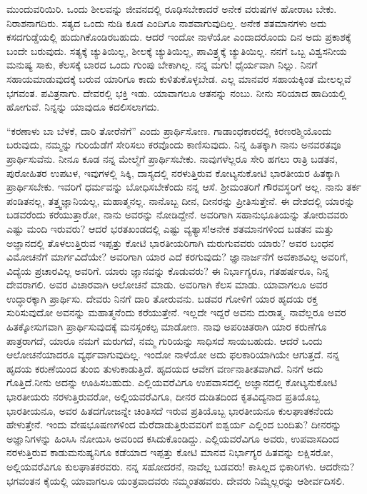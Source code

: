 ಮುಂದುವರಿಯಿರಿ. ಒಂದು ಶೀಲವನ್ನು ಜೀವನದಲ್ಲಿ ರೂಢಿಸಬೇಕಾದರೆ ಅನೇಕ ವರುಷಗಳ ಹೋರಾಟ ಬೇಕು. ನಿರಾಶನಾಗದಿರು. ಸತ್ಯದ ಒಂದು ನುಡಿ ಕೂಡ ಎಂದಿಗೂ ನಾಶವಾಗುವುದಿಲ್ಲ. ಅನೇಕ ಶತಮಾನಗಳು ಅದು ಕಸದಗುಡ್ಡೆಯಲ್ಲಿ ಹುದುಗಿಕೊಂಡಿರಬಹುದು. ಆದರೆ ಇಂದೋ ನಾಳೆಯೋ ಎಂದಾದರೊಂದು ದಿನ ಅದು ಪ್ರಕಾಶಕ್ಕೆ ಬಂದೇ ಬರುವುದು. ಸತ್ಯಕ್ಕೆ ಚ್ಯುತಿಯಿಲ್ಲ, ಶೀಲಕ್ಕೆ ಚ್ಯುತಿಯಿಲ್ಲ, ಪಾವಿತ್ರ್ಯಕ್ಕೆ ಚ್ಯುತಿಯಿಲ್ಲ. ನನಗೆ ಒಬ್ಬ ವಿಶ್ವಸನೀಯ ಮನುಷ್ಯ ಸಾಕು, ಕೆಲಸಕ್ಕೆ ಬಾರದ ಒಂದು ಗುಂಪು ಬೇಕಾಗಿಲ್ಲ. ನನ್ನ ಮಗು! ಧೈರ್ಯವಾಗಿ ನಿಲ್ಲು. ನಿನಗೆ ಸಹಾಯಮಾಡುವುದಕ್ಕೆ ಬರುವ ಯಾರಿಗೂ ಕಾದು ಕುಳಿತುಕೊಳ್ಳಬೇಡ. ಎಲ್ಲ ಮಾನವರ ಸಹಾಯಕ್ಕಿಂತ ಮೇಲಲ್ಲವೆ ಭಗವಂತ. ಪವಿತ್ರನಾಗು. ದೇವರಲ್ಲಿ ಭಕ್ತಿ ಇಡು. ಯಾವಾಗಲೂ ಆತನನ್ನು ನಂಬು. ನೀನು ಸರಿಯಾದ ಹಾದಿಯಲ್ಲಿ ಹೋಗುವೆ. ನಿನ್ನನ್ನು ಯಾವುದೂ ಕದಲಿಸಲಾಗದು.

“ಕರಣಾಳು ಬಾ ಬೆಳಕೆ, ದಾರಿ ತೋರೆನೆಗೆ” ಎಂದು ಪ್ರಾರ್ಥಿಸೋಣ. ಗಾಡಾಂಧಕಾರದಲ್ಲಿ ಕಿರಣರಶ್ಮಿಯೊಂದು ಬರುವುದು, ನಮ್ಮನ್ನು ಗುರಿಯೆಡೆಗೆ ಸೇರಿಸಲು ಕರವೊಂದು ಕಾಣಿಸುವುದು. ನಿನ್ನ ಹಿತಕ್ಕಾಗಿ ನಾನು ಅನವರತವೂ ಪ್ರಾರ್ಥಿಸುವೆನು. ನೀನೂ ಕೂಡ ನನ್ನ ಮೇಲ್ಮೆಗೆ ಪ್ರಾರ್ಥಿಸಬೇಕು. ನಾವುಗಳೆಲ್ಲರೂ ಸೇರಿ ಹಗಲು ರಾತ್ರಿ ಬಡತನ, ಪುರೋಹಿತರ ಉಪಟಳ, ಇವುಗಳಲ್ಲಿ ಸಿಕ್ಕಿ, ದಾಸ್ಯದಲ್ಲಿ ನರಳುತ್ತಿರುವ ಕೋಟ್ಯನುಕೋಟಿ ಭಾರತೀಯರ ಹಿತಕ್ಕಾಗಿ ಪ್ರಾರ್ಥಿಸಬೇಕು. ಇವರಿಗೆ ಧರ್ಮವನ್ನು ಬೋಧಿಸಬೇಕೆಂದು ನನ್ನ ಆಸೆ. ಶ‍್ರೀಮಂತರಿಗೆ ಗೌರವಸ್ಥರಿಗೆ ಅಲ್ಲ. ನಾನು ತರ್ಕ ಪಂಡಿತನಲ್ಲ, ತತ್ತ್ವಜ್ಞಾನಿಯಲ್ಲ, ಮಹಾತ್ಮನಲ್ಲ. ನಾನೊಬ್ಬ ದೀನ, ದೀನರನ್ನು ಪ್ರೀತಿಸುತ್ತೇನೆ. ಈ ದೇಶದಲ್ಲಿ ಯಾರನ್ನು ಬಡವರೆಂದು ಕರೆಯುತ್ತಾರೋ, ನಾನು ಅವರನ್ನು ನೋಡಿದ್ದೇನೆ. ಅವರಿಗಾಗಿ ಸಹಾನುಭೂತಿಯನ್ನು ತೋರುವವರು ಎಷ್ಟು ಮಂದಿ ಇರುವರು? ಆದರೆ ಭರತಖಂಡದಲ್ಲಿ ಎಷ್ಟು ವ್ಯತ್ಯಾಸ!ಅನೇಕ ಶತಮಾನಗಳಿಂದ ಬಡತನ ಮತ್ತು ಅಜ್ಞಾನದಲ್ಲಿ ತೊಳಲುತ್ತಿರುವ ಇಪ್ಪತ್ತು ಕೋಟಿ ಭಾರತೀಯರಿಗಾಗಿ ಮರುಗುವವರು ಯಾರು? ಅವರ ಬಂಧನ ವಿಮೋಚನೆಗೆ ಮಾರ್ಗವಿದೆಯೇ? ಅವರಿಗಾಗಿ ಯಾರ ಎದೆ ಕರಗುವುದು? ಜ್ಞಾನಾರ್ಜನೆಗೆ ಅವಕಾಶವಿಲ್ಲ ಅವರಿಗೆ, ವಿದ್ಯೆಯ ಪ್ರಚಾರವಿಲ್ಲ ಅವರಿಗೆ. ಯಾರು ಜ್ಞಾನವನ್ನು ಕೊಡುವರು? ಈ ನಿರ್ಭಾಗ್ಯರೂ, ಗತಹರ್ಷರೂ, ನಿನ್ನ ದೇವರಾಗಲಿ. ಅವರ ವಿಚಾರವಾಗಿ ಆಲೋಚನೆ ಮಾಡು. ಅವರಿಗಾಗಿ ಕೆಲಸ ಮಾಡು. ಯಾವಾಗಲೂ ಅವರ ಉದ್ಧಾರಕ್ಕಾಗಿ ಪ್ರಾರ್ಥಿಸು. ದೇವರು ನಿನಗೆ ದಾರಿ ತೋರುವನು. ಬಡವರ ಗೋಳಿಗೆ ಯಾರ ಹೃದಯ ರಕ್ತ ಸುರಿಸುವುದೋ ಅವನನ್ನು ಮಹಾತ್ಮನೆಂದು ಕರೆಯುತ್ತೇನೆ. ಇಲ್ಲದೇ ಇದ್ದರೆ ಅವನು ದುರಾತ್ಮ. ನಾವೆಲ್ಲರೂ ಅವರ ಹಿತಕ್ಕೋಸುಗವಾಗಿ ಪ್ರಾರ್ಥಿಸುವುದಕ್ಕೆ ಮನಸ್ಸಂಕಲ್ಪ ಮಾಡೋಣ. ನಾವು ಅಪರಿಚಿತರಾಗಿ ಯಾರ ಕರುಣೆಗೂ ಪಾತ್ರರಾಗದೆ, ಯಾರೂ ನಮಗೆ ಮರುಗದೆ, ನಮ್ಮ ಗುರಿಯನ್ನು ಸಾಧಿಸದೆ ಸಾಯಬಹುದು. ಆದರೆ ಒಂದು ಆಲೋಚನೆಯಾದರೂ ವ್ಯರ್ಥವಾಗುವುದಿಲ್ಲ. ಇಂದೋ ನಾಳೆಯೋ ಅದು ಫಲಕಾರಿಯಾಗಿಯೇ ಆಗುತ್ತದೆ. ನನ್ನ ಹೃದಯ ಕರುಣೆಯಿಂದ ತುಂಬಿ ತುಳುಕಾಡುತ್ತಿದೆ. ಹೃದಯದ ಆವೇಗ ವರ್ಣನಾತೀತವಾಗಿದೆ. ನಿನಗೆ ಅದು ಗೊತ್ತಿದೆ.ನೀನು ಅದನ್ನು ಊಹಿಸಬಹುದು. ಎಲ್ಲಿಯವರೆವಿಗೂ ಉಪವಾಸದಲ್ಲಿ ಅಜ್ಞಾನದಲ್ಲಿ ಕೋಟ್ಯನುಕೋಟಿ ಭಾರತೀಯರು ನರಳುತ್ತಿರುವರೋ, ಅಲ್ಲಿಯವರೆವಿಗೂ, ದೀನರ ದುಡಿತದಿಂದ ಕೃತವಿದ್ಯನಾದ ಪ್ರತಿಯೊಬ್ಬ ಭಾರತೀಯನೂ, ಅವರ ಹಿತದಗೋಜನ್ನೇ ಚಿಂತಿಸದೆ ಇರುವ ಪ್ರತಿಯೊಬ್ಬ ಭಾರತೀಯನೂ ಕುಲಘಾತಕನೆಂದು ಹೇಳುತ್ತೇನೆ. ಇಂದು ವೇಷಭೂಷಣಗಳಿಂದ ಮೆರೆದಾಡುತ್ತಿರುವವರಿಗೆ ಐಶ್ವರ್ಯ ಎಲ್ಲಿಂದ ಬಂದಿತು? ದೀನರನ್ನು ಅಜ್ಞಾನಿಗಳನ್ನು ಹಿಂಸಿಸಿ ನೋಯಿಸಿ ಅವರಿಂದ ಕಸಿದುಕೊಂಡಿದ್ದು. ಎಲ್ಲಿಯವರೆವಿಗೂ ಅವರು, ಉಪವಾಸದಿಂದ ನರಳುತ್ತಿರುವ ಕಾಡುಮನುಷ್ಯನಿಗೂ ಕಡೆಯಾದ ಇಪ್ಪತ್ತು ಕೋಟಿ ಮಾನವ ನಿರ್ಭಾಗ್ಯರ ಹಿತವನ್ನು ಲಕ್ಷಿಸರೋ, ಅಲ್ಲಿಯವರೆವಿಗೂ ಕುಲಘಾತಕರವರು. ನನ್ನ ಸಹೋದರನೆ, ನಾವೆಲ್ಲ ಬಡವರು! ಕಾಸಿಲ್ಲದ ಭಿಕಾರಿಗಳು. ಆದರೇನು? ಭಗವಂತನ ಕೈಯಲ್ಲಿ ಯಾವಾಗಲೂ ಯಂತ್ರವಾದವರು ನಮ್ಮಂತಹವರು. ದೇವರು ನಿಮ್ಮೆಲ್ಲರನ್ನು ಆಶೀರ್ವದಿಸಲಿ.
\vspace{-0.6cm}

